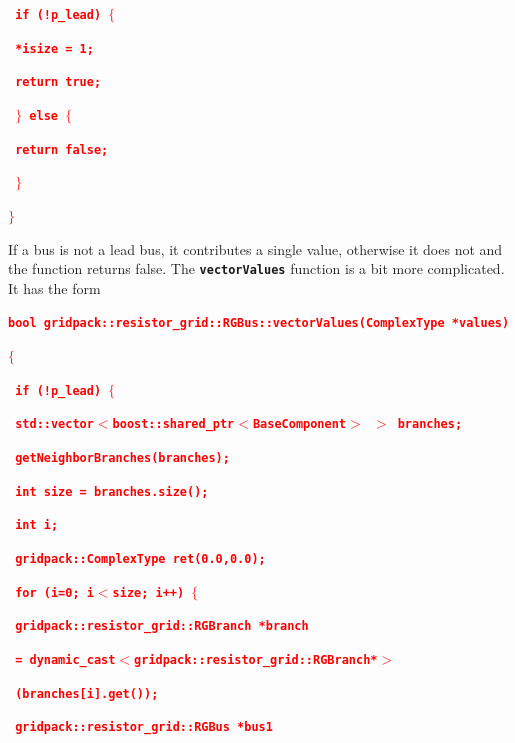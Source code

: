 \documentclass[12pt]{report} %
\begin{document}
\textcolor{red}{\texttt{\textbf{  if (!p\_lead) $\boldsymbol{\mathrm{\{}}$}}}

\textcolor{red}{\texttt{\textbf{    *isize = 1;}}}

\textcolor{red}{\texttt{\textbf{    return true;}}}

\textcolor{red}{\texttt{\textbf{  $\boldsymbol{\mathrm{\}}}$ else $\boldsymbol{\mathrm{\{}}$}}}

\textcolor{red}{\texttt{\textbf{    return false;}}}

\textcolor{red}{\texttt{\textbf{  $\boldsymbol{\mathrm{\}}}$}}}

\textcolor{red}{\texttt{\textbf{$\boldsymbol{\mathrm{\}}}$}}}

If a bus is not a lead bus, it contributes a single value, otherwise it does not and the function returns false. The \texttt{\textbf{vectorValues}} function is a bit more complicated. It has the form

\textcolor{red}{\texttt{\textbf{bool gridpack::resistor\_grid::RGBus::vectorValues(ComplexType *values)}}}

\textcolor{red}{\texttt{\textbf{$\boldsymbol{\mathrm{\{}}$}}}

\textcolor{red}{\texttt{\textbf{  if (!p\_lead) $\boldsymbol{\mathrm{\{}}$}}}

\textcolor{red}{\texttt{\textbf{    std::vector$\boldsymbol{\mathrm{<}}$boost::shared\_ptr$\boldsymbol{\mathrm{<}}$BaseComponent$\boldsymbol{\mathrm{>}}$ $\boldsymbol{\mathrm{>}}$ branches;}}}

\textcolor{red}{\texttt{\textbf{    getNeighborBranches(branches);}}}

\textcolor{red}{\texttt{\textbf{    int size = branches.size();}}}

\textcolor{red}{\texttt{\textbf{    int i;}}}

\textcolor{red}{\texttt{\textbf{    gridpack::ComplexType ret(0.0,0.0);}}}

\textcolor{red}{\texttt{\textbf{    for (i=0; i$\boldsymbol{\mathrm{<}}$size; i++) $\boldsymbol{\mathrm{\{}}$}}}

\textcolor{red}{\texttt{\textbf{      gridpack::resistor\_grid::RGBranch *branch}}}

\textcolor{red}{\texttt{\textbf{        = dynamic\_cast$\boldsymbol{\mathrm{<}}$gridpack::resistor\_grid::RGBranch*$\boldsymbol{\mathrm{>}}$}}}

\textcolor{red}{\texttt{\textbf{          (branches[i].get());}}}

\textcolor{red}{\texttt{\textbf{      gridpack::resistor\_grid::RGBus *bus1}}}
\end{document}
